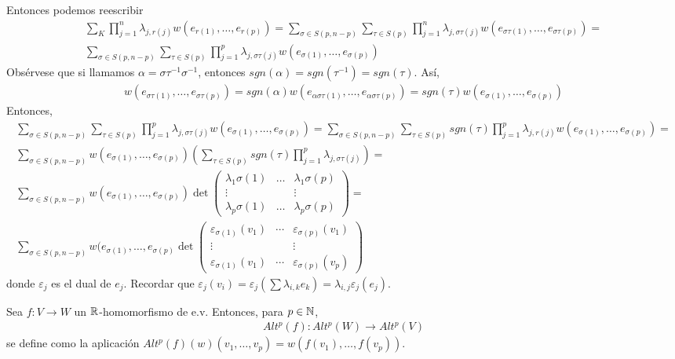 \documentclass[CV.tex]{subfiles}
\begin{document}
\begin{dem}
Entonces podemos reescribir
\begin{gather*}
\sum_K\prod_{j=1}^n\lambda_{j,r(j)}w(e_{r(1)},\dots, e_{r(p)})=\sum_{\sigma\in S(p,n-p)}\sum_{\tau\in S(p)}\prod_{j=1}^n\lambda_{j,\sigma\tau(j)}w(e_{\sigma\tau(1)},\dots, e_{\sigma\tau(p)})=\\
\sum_{\sigma\in S(p,n-p)}\sum_{\tau\in S(p)}\prod_{j=1}^p\lambda_{j,\sigma\tau(j)}w(e_{\sigma(1)},\dots, e_{\sigma(p)})
\end{gather*}
Obsérvese que si llamamos $\alpha=\sigma\tau^{-1}\sigma^{-1}$, entonces $sgn(\alpha)=sgn(\tau^{-1})=sgn(\tau)$. Así, 
\begin{gather*}
w(e_{\sigma\tau(1)},\dots, e_{\sigma\tau(p)})=sgn(\alpha)w(e_{\alpha\sigma\tau(1)},\dots, e_{\alpha\sigma\tau(p)})=sgn(\tau)w(e_{\sigma(1)},\dots,e_{\sigma(p)})
\end{gather*}
Entonces,
\begin{gather*}
\sum_{\sigma\in S(p,n-p)}\sum_{\tau\in S(p)}\prod_{j=1}^p\lambda_{j,\sigma\tau(j)}w(e_{\sigma(1)},\dots, e_{\sigma(p)})=\sum_{\sigma\in S(p,n-p)}\sum_{\tau
\in S(p)}sgn(\tau)\prod_{j=1}^p\lambda_{j,r(j)}w(e_{\sigma(1)},\dots, e_{\sigma(p)})=\\
\sum_{\sigma\in S(p,n-p)}w(e_{\sigma(1)},\dots, e_{\sigma(p)})\left(\sum_{\tau\in S(p)}sgn(\tau)\prod_{j=1}^p\lambda_{j,\sigma\tau(j)}\right)=\\
\sum_{\sigma\in S(p,n-p)}w(e_{\sigma(1)},\dots, e_{\sigma(p)})\det\begin{pmatrix}
\lambda_1\sigma(1) & \dots & \lambda_1\sigma(p)\\
\vdots & & \vdots\\
\lambda_p\sigma(1) & \dots & \lambda_p\sigma(p)
\end{pmatrix}=\\
\sum_{\sigma\in S(p,n-p)}w(e_{\sigma(1)},\dots, e_{\sigma(p)}\det\begin{pmatrix}
\varepsilon_{\sigma(1)}(v_1) & \cdots & \varepsilon_{\sigma(p)}(v_1)\\
\vdots & & \vdots\\
\varepsilon_{\sigma(1)}(v_1) & \cdots & \varepsilon_{\sigma(p)}(v_p)
\end{pmatrix}
\end{gather*}
donde $\varepsilon_j$ es el dual de $e_j$. Recordar que $\varepsilon_j(v_i)=\varepsilon_j(\sum\lambda_{i,k}e_k)=\lambda_{i,j}\varepsilon_j(e_j)$. \QED
\end{dem}

Sea $f:V\to W$ un $\mathbb{R}$-homomorfismo de e.v. Entonces, para $p\in\mathbb{N}$, 
\begin{align*}
Alt^p(f): Alt^p(W)\to Alt^p(V)
\end{align*}
se define como la aplicación $Alt^p(f)(w)(v_1,\dots, v_p)=w(f(v_1),\dots, f(v_p))$.
\end{document}
